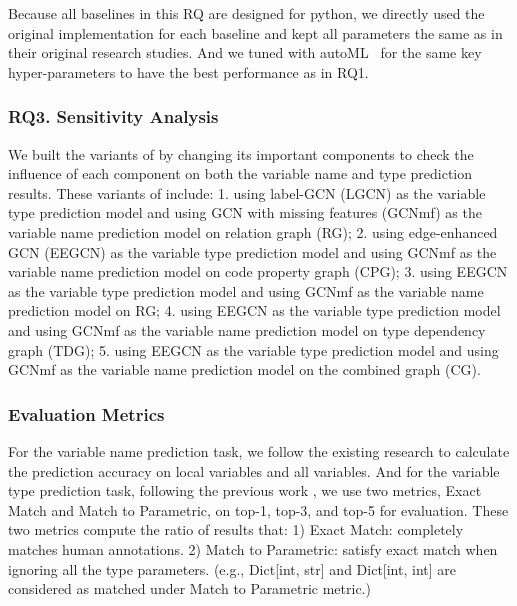 Because all baselines in this RQ are designed for python, we directly used the original implementation for each baseline and kept all parameters the same as in their original research studies. And we tuned {\tool} with autoML~\cite{NNI} for the same key hyper-parameters to have the best performance as in RQ1.

\subsubsection{RQ3. Sensitivity Analysis}

We built the variants of {\tool} by changing its important components to check the influence of each component on both the variable name and type prediction results. These variants of {\tool} include: 1. using label-GCN (LGCN) as the variable type prediction model and using GCN with missing features (GCNmf) as the variable name prediction model on relation graph (RG); 2. using edge-enhanced GCN (EEGCN) as the variable type prediction model and using GCNmf as the variable name prediction model on code property graph (CPG); 3. using EEGCN as the variable type prediction model and using GCNmf as the variable name prediction model on RG; 4. using EEGCN as the variable type prediction model and using GCNmf as the variable name prediction model on type dependency graph (TDG); 5. using EEGCN as the variable type prediction model and using GCNmf as the variable name prediction model on the combined graph (CG).

\subsubsection*{Evaluation Metrics}

For the variable name prediction task, we follow the existing research \cite{tran2019recovering} to calculate the prediction accuracy on local variables and all variables. And for the variable type prediction task, following the previous work \cite{type-graph-icse22}, we use two metrics, Exact Match and Match to Parametric, on top-1, top-3, and top-5 for evaluation. These two metrics compute the ratio of results that: 1) Exact Match: completely matches human annotations. 2) Match to Parametric: satisfy exact match when ignoring all the type parameters. (e.g., Dict[int, str] and Dict[int, int] are considered as matched under Match to Parametric metric.)

